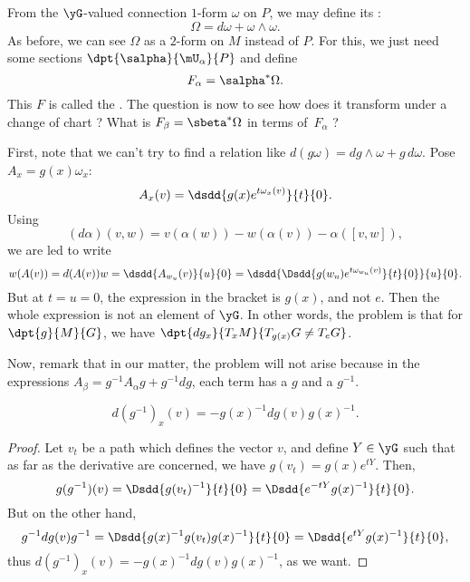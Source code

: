 From the $\yG$-valued connection $1$-form $\omega$ on $P$, we may define its  :
\begin{equation}
     \Omega=d\omega+\omega\wedge\omega.
\end{equation}
As before, we can see $\Omega$ as a $2$-form on $M$ instead of $P$. For this, we just need some sections $\dpt{\salpha}{\mU_{\alpha}}{P}$ and define
\begin{equation}
        F_{\alpha}=\salpha^*\Omega.
\end{equation}
This $F$ is called the . The question is now to see how does it transform under a change of chart ? What is $F_{\beta}=\sbeta^*\Omega$ in terms of~$F_{\alpha}$ ?

First, note that we can't try to find a relation like $d(g\omega)=dg\wedge\omega+g\,d\omega$. Pose $A_x=g(x)\omega_x$:
\[
  A_x(v)=\dsdd{g(x)e^{t\omega_x(v)}}{t}{0}.
\]
Using
\[
   (d\alpha)(v,w)=v(\alpha(w))-w(\alpha(v))-\alpha([v,w]),
\]
we are led to write
\begin{equation}
     w(A(v))=d(A(v))w
            =\dsdd{A_{w_u}(v)}{u}{0}
	    =\dsdd{ \Dsdd{g(w_u)e^{t\omega_{w_u}(v)}}{t}{0} }{u}{0}.
\end{equation}
But at $t=u=0$, the expression in the bracket is $g(x)$, and not $e$. Then the whole expression is not an element of $\yG$. In other words, the problem is that for $\dpt{g}{M}{G}$, we have $\dpt{dg_x}{T_xM}{T_{g(x)}G\neq T_eG}$.

Now, remark that in our matter, the problem will not arise because in the expressions $A_{\beta}=g^{-1} A_{\alpha} g+g^{-1} dg$, each term has a $g$ and a $g^{-1}$.

\begin{lemma}
\begin{equation}
   d(g^{-1})_x(v)=-g(x)^{-1} dg(v)g(x)^{-1}.
\end{equation}
\label{lem:dgemu}
\end{lemma}

\begin{proof}
Let $v_t$ be a path which defines the vector $v$, and define $Y\in\yG$ such that as far as the derivative are concerned, we have $g(v_t)=g(x)e^{tY}$. Then,
\[
      g(g^{-1})(v)=\Dsdd{g(v_t)^{-1}}{t}{0}=\Dsdd{e^{-tY}g(x)^{-1}}{t}{0}.
\]
But on the other hand,
\[
  g^{-1} dg(v)g^{-1}=\Dsdd{g(x)^{-1} g(v_t)g(x)^{-1}}{t}{0}=\Dsdd{e^{tY}g(x)^{-1}}{t}{0},
\]
thus $d(g^{-1})_x(v)=-g(x)^{-1} dg(v)g(x)^{-1}$, as we want.
\end{proof}

